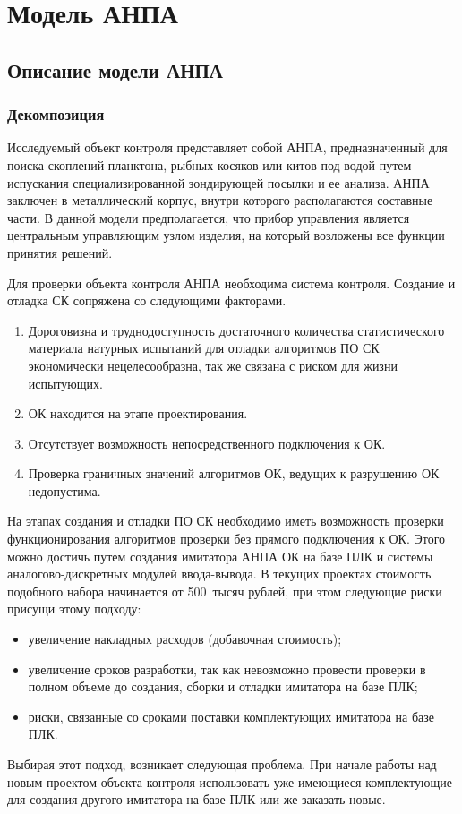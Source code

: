 \chapter{Модель АНПА}
\section{Описание модели АНПА} \label{sec:model_anpa}
\subsection{Декомпозиция}

Исследуемый объект контроля представляет собой АНПА, предназначенный для поиска скоплений планктона,
рыбных косяков или китов под водой путем испускания специализированной зондирующей посылки и ее анализа.
АНПА заключен в металлический корпус, внутри которого располагаются составные части.
В данной модели предполагается, что прибор управления является центральным управляющим узлом изделия,
на который возложены все функции принятия решений.

Для проверки объекта контроля АНПА необходима система контроля.
Создание и отладка СК сопряжена со следующими факторами.
\begin{enumerate}
    \item Дороговизна и труднодоступность достаточного количества статистического материала
    натурных испытаний для отладки алгоритмов ПО СК экономически нецелесообразна, так же связана с риском для жизни испытующих.
    \item ОК находится на этапе проектирования.
    \item Отсутствует возможность непосредственного подключения к ОК.
    \item Проверка граничных значений алгоритмов ОК, ведущих к разрушению ОК недопустима.
\end{enumerate}
На этапах создания и отладки ПО СК необходимо иметь возможность проверки
функционирования алгоритмов проверки без прямого подключения к ОК.
Этого можно достичь путем создания имитатора АНПА ОК на базе ПЛК и системы аналогово-дискретных
модулей ввода-вывода.
В текущих проектах стоимость подобного набора начинается от 500~тысяч рублей,
при этом следующие риски присущи этому подходу:
\begin{itemize}
    \item увеличение накладных расходов (добавочная стоимость);
    \item увеличение сроков разработки, так как невозможно провести проверки в полном объеме до 
        создания, сборки и отладки имитатора на базе ПЛК;
    \item риски, связанные со сроками поставки комплектующих имитатора на базе ПЛК.
\end{itemize}
Выбирая этот подход, возникает следующая проблема. При начале работы над новым проектом объекта контроля
использовать уже имеющиеся комплектующие для создания другого имитатора на базе ПЛК или же заказать новые.


